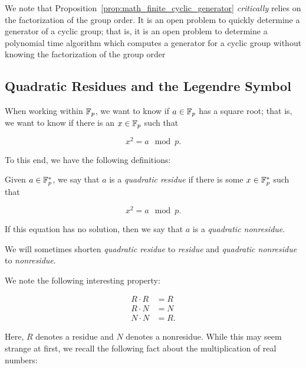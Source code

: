 We note that Proposition~\ref{prop:math_finite_cyclic_generator}
\emph{critically} relies on the factorization of the group order.
It is an open problem to quickly determine a generator of a \gls{cyclic group};
that is, it is an open problem to determine a polynomial time algorithm
which computes a generator for a \gls{cyclic group} without knowing
the factorization of the group order~\cite[Remark 11.1.25]{mullen2013handbook}


\subsection{Quadratic Residues and the Legendre Symbol}
\label{app:math_finite_fields_legendre}

When working within $\mathbb{F}_{p}$, we want to know if $a\in\mathbb{F}_{p}$
has a square root;
that is, we want to know if there is an $x\in\mathbb{F}_{p}$ such that

\begin{equation}
    x^{2} = a \mod p.
\end{equation}

To this end, we have the following definitions:

\begin{defn}
Given $a\in\mathbb{F}_{p}^{*}$, we say that $a$ is a \emph{quadratic residue}
if there is some $x\in\mathbb{F}_{p}^{*}$ such that

\begin{equation}
    x^{2} = a \mod p.
\end{equation}

\noindent
If this equation has no solution, then we say that $a$
is a \emph{quadratic nonresidue}.
\end{defn}

\noindent
We will sometimes shorten \emph{quadratic residue} to \emph{residue}
and \emph{quadratic nonresidue} to \emph{nonresidue}.

We note the following interesting property:

\begin{align}
    R\cdot R &= R \nonumber\\
    R\cdot N &= N \nonumber\\
    N\cdot N &= R.
\end{align}

\noindent
Here, $R$ denotes a residue and $N$ denotes a nonresidue.
While this may seem strange at first, we recall the following
fact about the multiplication of real numbers:

